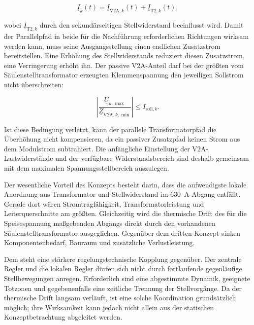 \begin{equation}
    \underline I_k(t)
    =
    \underline I_{\mathrm{V2A},k}(t)
    +
    \underline I_{\mathrm{T2},k}(t),
    \label{eq:konzept_master_slave_strom}
\end{equation}

wobei $\underline I_{\mathrm{T2},k}$ durch den sekundärseitigen
Stellwiderstand beeinflusst wird. Damit der Parallelpfad in beide für die
Nachführung erforderlichen Richtungen wirksam werden kann, muss seine
Ausgangsstellung einen endlichen Zusatzstrom bereitstellen. Eine Erhöhung des
Stellwiderstands reduziert diesen Zusatzstrom, eine Verringerung erhöht ihn.
Der passive V2A-Anteil darf bei der größten vom Säulenstelltransformator
erzeugten Klemmenspannung den jeweiligen Sollstrom nicht überschreiten:

\begin{equation}
    \left|
        \frac{\underline U_{k,\max}}
             {\underline Z_{\mathrm{V2A},k,\min}}
    \right|
    \leq
    I_{\mathrm{soll},k}.
    \label{eq:konzept_630_passivbedingung}
\end{equation}

Ist diese Bedingung verletzt, kann der parallele Transformatorpfad die
Überhöhung nicht kompensieren, da ein passiver Zusatzpfad keinen Strom aus
dem Modulstrom subtrahiert. Die anfängliche Einstellung der
V2A-Last\-widerstände und der verfügbare Widerstandsbereich sind deshalb
gemeinsam mit dem maximalen Spannungsstellbereich auszulegen.

Der wesentliche Vorteil des Konzepts besteht darin, dass die aufwendigste
lokale Anordnung aus Transformator und Stellwiderstand im
\SI{630}{\ampere}-Abgang entfällt. Gerade dort wären Stromtrag\-fähigkeit,
Transformatorleistung und Leiterquerschnitte am größten. Gleichzeitig wird
die thermische Drift des für die Speisespannung maßgebenden Abgangs direkt
durch den vorhandenen Säulenstelltransformator ausgeglichen. Gegenüber dem
dritten Konzept sinken Komponentenbedarf, Bauraum und zusätzliche
Verlustleistung.

Dem steht eine stärkere regelungstechnische Kopplung gegenüber. Der zentrale
Regler und die lokalen Regler dürfen sich nicht durch fortlaufende
gegenläufige Stellbewegungen anregen. Erforderlich sind eine abgestimmte
Dynamik, geeignete Totzonen und gegebenenfalls eine zeitliche Trennung der
Stellvorgänge. Da der thermische Drift langsam verläuft, ist eine solche
Koordination grundsätzlich möglich; ihre Wirksamkeit kann jedoch nicht allein
aus der statischen Konzeptbetrachtung abgeleitet werden.

